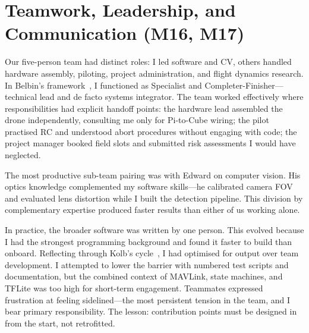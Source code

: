 \section{Teamwork, Leadership, and Communication (M16, M17)}
\label{sec:teamwork}

Our five-person team had distinct roles: I led software and CV, others handled hardware assembly, piloting, project administration, and flight dynamics research. In Belbin's framework~\cite{belbin2010}, I functioned as Specialist and Completer-Finisher---technical lead and de facto systems integrator. The team worked effectively where responsibilities had explicit handoff points: the hardware lead assembled the drone independently, consulting me only for Pi-to-Cube wiring; the pilot practised RC and understood abort procedures without engaging with code; the project manager booked field slots and submitted risk assessments I would have neglected.

The most productive sub-team pairing was with Edward on computer vision. His optics knowledge complemented my software skills---he calibrated camera FOV and evaluated lens distortion while I built the detection pipeline. This division by complementary expertise produced faster results than either of us working alone.

In practice, the broader software was written by one person. This evolved because I had the strongest programming background and found it faster to build than onboard. Reflecting through Kolb's cycle~\cite{kolb1984}, I had optimised for output over team development. I attempted to lower the barrier with numbered test scripts and documentation, but the combined context of MAVLink, state machines, and TFLite was too high for short-term engagement. Teammates expressed frustration at feeling sidelined---the most persistent tension in the team, and I bear primary responsibility. The lesson: contribution points must be designed in from the start, not retrofitted.

